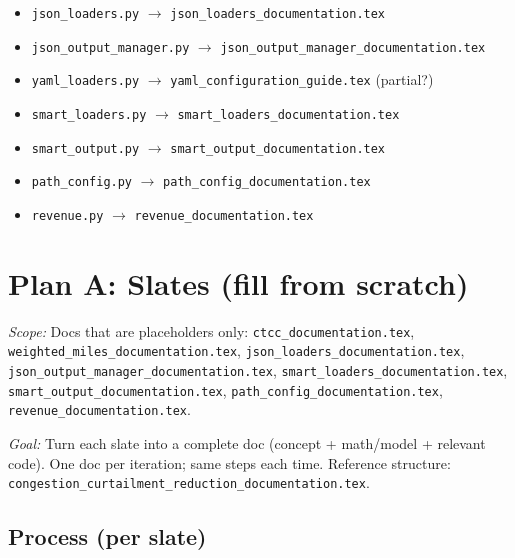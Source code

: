 \documentclass[12pt]{article}
\begin{document}
\begin{itemize}
  \item \texttt{json\_loaders.py} $\to$ \texttt{json\_loaders\_documentation.tex}
  \item \texttt{json\_output\_manager.py} $\to$ \texttt{json\_output\_manager\_documentation.tex}
  \item \texttt{yaml\_loaders.py} $\to$ \texttt{yaml\_configuration\_guide.tex} (partial?)
  \item \texttt{smart\_loaders.py} $\to$ \texttt{smart\_loaders\_documentation.tex}
  \item \texttt{smart\_output.py} $\to$ \texttt{smart\_output\_documentation.tex}
  \item \texttt{path\_config.py} $\to$ \texttt{path\_config\_documentation.tex}
  \item \texttt{revenue.py} $\to$ \texttt{revenue\_documentation.tex}
\end{itemize}

\section{Plan A: Slates (fill from scratch)}

\textit{Scope:} Docs that are placeholders only: \texttt{ctcc\_documentation.tex}, \texttt{weighted\_miles\_documentation.tex}, \texttt{json\_loaders\_documentation.tex}, \texttt{json\_output\_manager\_documentation.tex}, \texttt{smart\_loaders\_documentation.tex}, \texttt{smart\_output\_documentation.tex}, \texttt{path\_config\_documentation.tex}, \texttt{revenue\_documentation.tex}.

\textit{Goal:} Turn each slate into a complete doc (concept + math/model + relevant code). One doc per iteration; same steps each time. Reference structure: \texttt{congestion\_curtailment\_reduction\_documentation.tex}.

\subsection{Process (per slate)}
\end{document}
